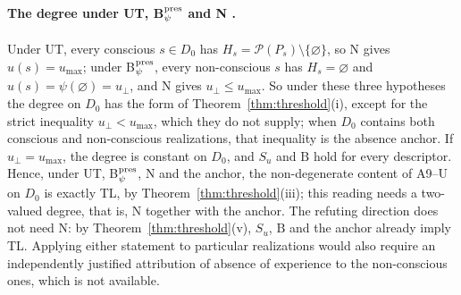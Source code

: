 \paragraph{The degree under UT, B$_\psi^{\rm pres}$ and N \stA.} Under UT, every conscious $s\in D_0$ has $H_s=\mathcal P(P_s)\setminus\{\varnothing\}$, so N gives $u(s)=u_{\max}$; under B$_\psi^{\rm pres}$, every non-conscious $s$ has $H_s=\varnothing$ and $u(s)=\psi(\varnothing)=u_\bot$, and N gives $u_\bot\le u_{\max}$. So under these three hypotheses the degree on $D_0$ has the form of Theorem~\ref{thm:threshold}(i), except for the strict inequality $u_\bot<u_{\max}$, which they do not supply; when $D_0$ contains both conscious and non-conscious realizations, that inequality is the absence anchor. If $u_\bot=u_{\max}$, the degree is constant on $D_0$, and $S_u$ and $\mathrm B$ hold for every descriptor. Hence, under UT, B$_\psi^{\rm pres}$, N and the anchor, the non-degenerate content of A9--U on $D_0$ is exactly TL, by Theorem~\ref{thm:threshold}(iii); this reading needs a two-valued degree, that is, N together with the anchor. The refuting direction does not need N: by Theorem~\ref{thm:threshold}(v), $S_u$, $\mathrm B$ and the anchor already imply TL. Applying either statement to particular realizations would also require an independently justified attribution of absence of experience to the non-conscious ones, which is not available.

